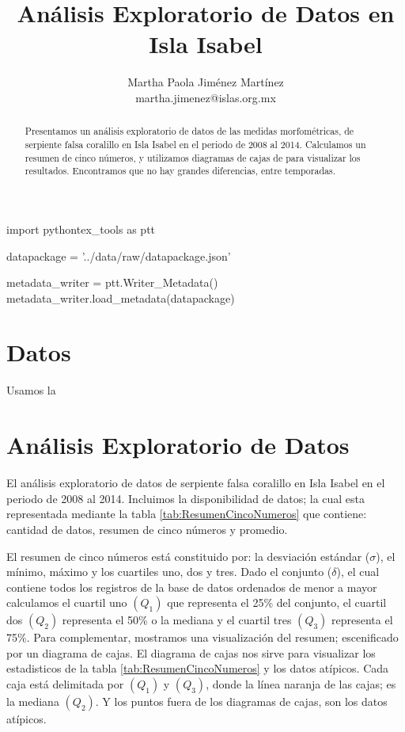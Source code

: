 \documentclass{article}
\begin{document}
 

\author{Martha Paola Jiménez Martínez \\ 
\small{martha.jimenez@islas.org.mx}} 
\title{Análisis Exploratorio de Datos en Isla Isabel }  


\maketitle

\begin{abstract}
Presentamos un análisis exploratorio de datos de las medidas morfométricas, de serpiente falsa
coralillo en Isla  Isabel en el periodo de 2008 al 2014. Calculamos un resumen de cinco números, y
utilizamos diagramas de cajas de para visualizar los resultados. Encontramos que no hay grandes
diferencias, entre temporadas.
\end{abstract}

\begin{pycode}
import pythontex_tools as ptt

datapackage = '../data/raw/datapackage.json'

metadata_writer = ptt.Writer_Metadata()
metadata_writer.load_metadata(datapackage)

\end{pycode}

\section*{Datos}
Usamos la 

\section*{Análisis Exploratorio de Datos}
El análisis exploratorio de datos de serpiente falsa coralillo en Isla Isabel en el periodo de 2008
al 2014. Incluimos la disponibilidad de datos; la cual esta representada mediante la tabla
\ref{tab:ResumenCincoNumeros} que contiene: cantidad de datos, resumen de cinco números y promedio.

El resumen de cinco números está constituido por: la desviación estándar ($\sigma$), el mínimo,
máximo y los cuartiles uno, dos y tres. Dado el conjunto
($\delta$), el cual contiene todos los registros de la base de datos ordenados de menor a mayor
calculamos el cuartil uno $(Q_1)$ que representa el 25\% del conjunto, el cuartil
dos $(Q_2)$ representa el 50\% o la mediana y el cuartil tres $(Q_3)$ representa el 75\%.
Para complementar, mostramos una visualización del resumen; escenificado por un diagrama de cajas. 
El diagrama de cajas nos sirve para visualizar los estadisticos de la tabla
\ref{tab:ResumenCincoNumeros} y los datos atípicos. Cada caja está delimitada por $(Q_1)$ y $(Q_3)$,
donde la línea naranja de las cajas; es la mediana $(Q_2)$. Y los puntos fuera de los diagramas
de cajas, son los datos atípicos.
\end{document}
